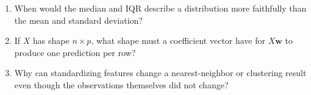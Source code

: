 \begin{quickcheck}
\begin{enumerate}
  \item When would the median and IQR describe a distribution more faithfully than the mean and standard deviation?
  \item If \(X\) has shape \(n\times p\), what shape must a coefficient vector have for \(X\bm{w}\) to produce one prediction per row?
  \item Why can standardizing features change a nearest-neighbor or clustering result even though the observations themselves did not change?
\end{enumerate}
\end{quickcheck}
